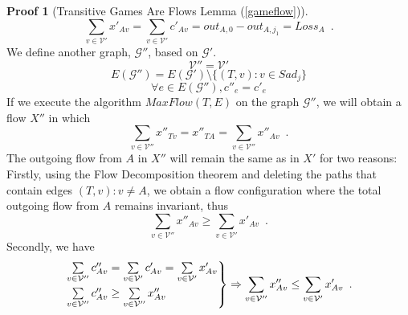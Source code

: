 \documentclass[11pt]{llncs}
\theoremstyle{definition}
\newtheorem*{sepproof}{Proof}
\begin{document}
\begin{sepproof}[Transitive Games Are Flows Lemma (\ref{gameflow})]
\begin{equation}
       \label{xprimeequalloss}
          \sum\limits_{v \in \mathcal{V}'}x'_{Av} = \sum\limits_{v \in \mathcal{V}'}c'_{Av} = out_{A, 0} - out_{A, j_1} =
          Loss_A \enspace.
       \end{equation}
       We define another graph, $\mathcal{G}''$, based on $\mathcal{G}'$.
       \begin{equation*}
          \mathcal{V}'' = \mathcal{V}'
       \end{equation*}
       \begin{equation*}
          E(\mathcal{G}'') = E(\mathcal{G}') \setminus \{(T, v) : v \in Sad_j\}
       \end{equation*}
       \begin{equation*}
          \forall e \in E(\mathcal{G}''), c''_e = c'_e
       \end{equation*}
       If we execute the algorithm $MaxFlow(T, E)$ on the graph $\mathcal{G}''$, we will obtain a flow $X''$ in which
       \begin{equation*}
          \sum\limits_{v \in \mathcal{V}''}x''_{Tv} = x''_{TA} = \sum\limits_{v \in \mathcal{V}''}x''_{Av} \enspace.
       \end{equation*}
       The outgoing flow from $A$ in $X''$ will remain the same as in $X'$ for two reasons: Firstly, using the Flow
       Decomposition theorem \cite{amo} and deleting the paths that contain edges $\left(T, v\right): v \neq A$, we
       obtain a flow configuration where the total outgoing flow from $A$ remains invariant,
       thus
       \begin{equation*}
          \sum\limits_{v \in \mathcal{V}''}x''_{Av} \geq \sum\limits_{v \in \mathcal{V}'}x'_{Av} \enspace.
       \end{equation*}
       Secondly, we have
       \begin{equation*}
          \begin{rcases}
             \sum\limits_{v \in \mathcal{V}''}c''_{Av} = \sum\limits_{v \in \mathcal{V}'}c'_{Av} = \sum\limits_{v \in
             \mathcal{V}'}x'_{Av} \\
             \sum\limits_{v \in \mathcal{V}''}c''_{Av} \geq \sum\limits_{v \in \mathcal{V}''}x''_{Av}
          \end{rcases}
          \Rightarrow \sum\limits_{v \in \mathcal{V}''}x''_{Av} \leq \sum\limits_{v \in \mathcal{V}'}x'_{Av} \enspace.
       \end{equation*}

\end{sepproof}
\end{document}
